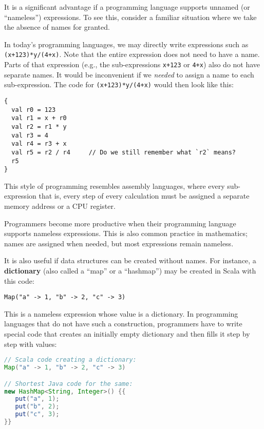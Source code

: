 It is a significant advantage if a programming language supports unnamed
(or \textsf{``}nameless\textsf{''}) expressions. To see this, consider a familiar
situation where we take the absence of names for granted.

In today\textsf{'}s programming languages, we may directly write expressions
such as \texttt{}\lstinline!(x+123)*y/(4+x)!. Note that the entire
expression does not need to have a name. Parts of that expression
(e.g., the sub-expressions \texttt{}\lstinline!x+123! or \lstinline!4+x!)
also do not have separate names. It would be inconvenient if we \emph{needed}
to assign a name to each sub-expression. The code for \lstinline!(x+123)*y/(4+x)!
would then look like this:

\begin{lstlisting}
{
  val r0 = 123
  val r1 = x + r0
  val r2 = r1 * y
  val r3 = 4 
  val r4 = r3 + x
  val r5 = r2 / r4     // Do we still remember what `r2` means?
  r5
}
\end{lstlisting}

This style of programming resembles assembly languages,
where every sub-expression \textemdash{} that is, every step of every
calculation \textemdash{} must be assigned a separate memory address
or a CPU register.

Programmers become more productive when their programming language
supports nameless expressions. This is also common practice in mathematics;
names are assigned when needed, but most expressions remain nameless.

It is also useful if data structures can be created without names.
For instance, a \textbf{dictionary} (also called
a \textsf{``}map\textsf{''} or a \textsf{``}hashmap\textsf{''}) may be created in Scala with this
code:
\begin{lstlisting}
Map("a" -> 1, "b" -> 2, "c" -> 3)
\end{lstlisting}
This is a nameless expression whose value is a dictionary. In programming
languages that do not have such a construction, programmers have to
write special code that creates an initially empty dictionary and
then fills it step by step with values:
\begin{lstlisting}[language=Java]
// Scala code creating a dictionary:
Map("a" -> 1, "b" -> 2, "c" -> 3)

// Shortest Java code for the same:
new HashMap<String, Integer>() {{
   put("a", 1);
   put("b", 2);
   put("c", 3);
}}
\end{lstlisting}

